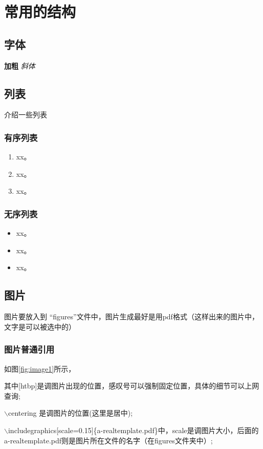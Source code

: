 ﻿%

\chapter{常用的结构}
\label{chap02}
\section{字体}
\textbf{加粗}
\emph{斜体}

\section{列表}
介绍一些列表
\subsection{有序列表}
\begin{enumerate}
    \item xx。
    \item xx。
    \item xx。
\end{enumerate}
\subsection{无序列表}
\begin{itemize}
    \item xx。
    \item xx。
    \item xx。
\end{itemize}


\section{图片}
图片要放入到 “figures”文件中，图片生成最好是用pdf格式（这样出来的图片中，文字是可以被选中的）

\subsection{图片普通引用}

如图\ref{fig:image1}所示，

其中[htbp]是调图片出现的位置，感叹号可以强制固定位置，具体的细节可以上网查询;

$\backslash$centering 是调图片的位置(这里是居中); 

$\backslash$includegraphics[scale=0.15]\{a-realtemplate.pdf\}中，scale是调图片大小，后面的a-realtemplate.pdf则是图片所在文件的名字（在figures文件夹中）;

